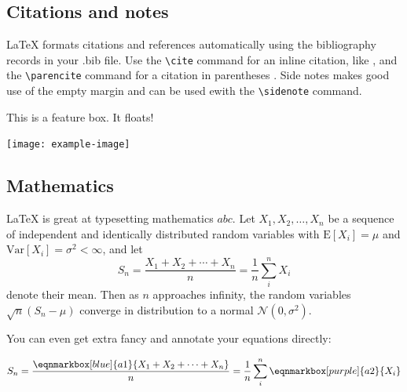\begin{figure}
\begin{fullwidth}
    \end{fullwidth}
\end{figure}

\subsection{Citations and notes}

LaTeX formats citations and references automatically using the bibliography records in your .bib file. Use the \verb|\cite| command for an inline citation, like \cite{Pooley2021}, and the \verb|\parencite| command for a citation in parentheses \parencite{Brembs2021}. Side notes makes good use of the empty margin and can be used ewith the \verb|\sidenote| command. 


\begin{featurebox}
\caption{This is an example feature box}
\label{box:simple}
This is a feature box. It floats!
\medskip

\texttt{[image: example-image]}

\lipsum[1]
\end{featurebox}

\subsection{Mathematics}

\LaTeX{} is great at typesetting mathematics $abc$. Let $X_1, X_2, \ldots, X_n$ be a sequence of independent and identically distributed random variables with $\text{E}[X_i] = \mu$ and $\text{Var}[X_i] = \sigma^2 < \infty$, and let
\begin{equation}
\label{eq:CLT}
S_n = \frac{X_1 + X_2 + \cdots + X_n}{n}
      = \frac{1}{n}\sum_{i}^{n} X_i
\end{equation}
denote their mean. Then as $n$ approaches infinity, the random variables $\sqrt{n}(S_n - \mu)$ converge in distribution to a normal $\mathcal{N}(0, \sigma^2)$.

You can even get extra fancy and annotate your equations directly: %

\vspace{1.5em} 
\begin{equation}
\label{eq:CLT2}
S_n = \frac{\eqnmarkbox[blue]{a1}{X_1 + X_2 + \cdots + X_n}}{n}
      = \frac{1}{n}\sum_{i}^{n} \eqnmarkbox[purple]{a2}{X_i}
\end{equation}
\vspace{1.5em} 

